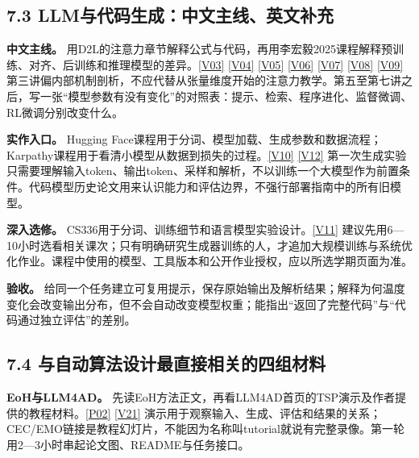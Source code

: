 \subsection{7.3
LLM与代码生成：中文主线、英文补充}\label{llmux4e0eux4ee3ux7801ux751fux6210ux4e2dux6587ux4e3bux7ebfux82f1ux6587ux8865ux5145}

\textbf{中文主线。}
用D2L的注意力章节解释公式与代码，再用李宏毅2025课程解释预训练、对齐、后训练和推理模型的差异。\href{https://courses.d2l.ai/zh-v2/}{{[}V03{]}}
\href{https://zh.d2l.ai/}{{[}V04{]}}
\href{https://speech.ee.ntu.edu.tw/~hylee/ml/2025-spring.php}{{[}V05{]}}
\href{https://www.youtube.com/watch?v=Xnil63UDW2o}{{[}V06{]}}
\href{https://www.youtube.com/watch?v=Ozos6M1JtIE}{{[}V07{]}}
\href{https://www.youtube.com/watch?v=Z6b5-77EfGk}{{[}V08{]}}
\href{https://www.youtube.com/watch?v=bJFtcwLSNxI}{{[}V09{]}}
第三讲偏内部机制剖析，不应代替从张量维度开始的注意力教学。第五至第七讲之后，写一张``模型参数有没有变化''的对照表：提示、检索、程序进化、监督微调、RL微调分别改变什么。

\textbf{实作入口。} Hugging
Face课程用于分词、模型加载、生成参数和数据流程；Karpathy课程用于看清小模型从数据到损失的过程。\href{https://karpathy.ai/zero-to-hero.html}{{[}V10{]}}
\href{https://huggingface.co/learn/llm-course/zh-CN/chapter1/1}{{[}V12{]}}
第一次生成实验只需要理解输入token、输出token、采样和解析，不以训练一个大模型作为前置条件。代码模型历史论文用来认识能力和评估边界，不强行部署指南中的所有旧模型。

\textbf{深入选修。}
CS336用于分词、训练细节和语言模型实验设计。\href{https://cs336.stanford.edu/spring2025/}{{[}V11{]}}
建议先用6---10小时选看相关课次；只有明确研究生成器训练的人，才追加大规模训练与系统优化作业。课程中使用的模型、工具版本和公开作业授权，应以所选学期页面为准。

\textbf{验收。}
给同一个任务建立可复用提示，保存原始输出及解析结果；解释为何温度变化会改变输出分布，但不会自动改变模型权重；能指出``返回了完整代码''与``代码通过独立评估''的差别。

\subsection{7.4
与自动算法设计最直接相关的四组材料}\label{ux4e0eux81eaux52a8ux7b97ux6cd5ux8bbeux8ba1ux6700ux76f4ux63a5ux76f8ux5173ux7684ux56dbux7ec4ux6750ux6599}

\textbf{EoH与LLM4AD。}
先读EoH方法正文，再看LLM4AD首页的TSP演示及作者提供的教程材料。\href{https://arxiv.org/abs/2401.02051}{{[}P02{]}}
\href{https://www.llm4ad.com/}{{[}V21{]}}
演示用于观察输入、生成、评估和结果的关系；CEC/EMO链接是教程幻灯片，不能因为名称叫tutorial就说有完整录像。第一轮用2---3小时串起论文图、README与任务接口。

